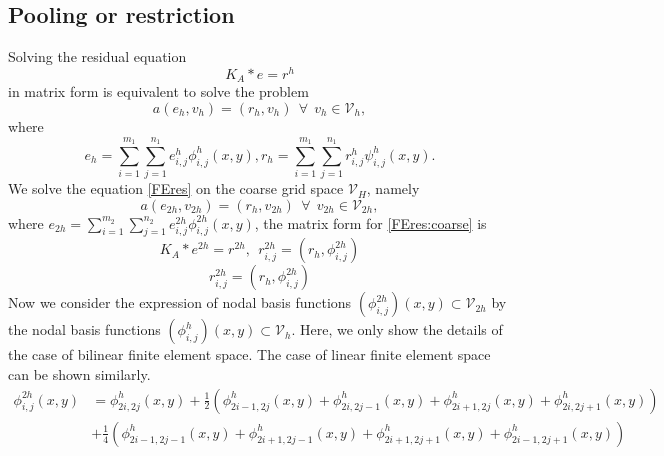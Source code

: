 \subsection{Pooling or restriction}\label{sec:cnn-restriction}
Solving the residual equation 
$$
K_A\ast e=r^h
$$
in matrix form is equivalent to solve the problem 
\begin{equation}\label{FEres}
a(e_h, v_h)=(r_h,v_h)~~\forall~~v_h\in \mathcal V_h,
\end{equation}
where 
\begin{equation}\label{expresion:residual}
e_h=\sum_{i=1}^{m_1}\sum_{j=1}^{n_1}e^h_{i,j}\phi^h_{i,j}(x,y), r_h=\sum_{i=1}^{m_1}\sum_{j=1}^{n_1}r^h_{i,j}\psi^h_{i,j}(x,y).
\end{equation}
We solve the equation \eqref{FEres} on the coarse grid space $\mathcal V_H$, namely 
\begin{equation}\label{FEres:coarse}
a(e_{2h}, v_{2h})=(r_h,v_{2h})~~\forall~~v_{2h}\in \mathcal V_{2h},
\end{equation}
where $e_{2h}=\sum_{i=1}^{m_2}\sum_{j=1}^{n_2}e^{2h}_{i,j}\phi^{2h}_{i,j}(x,y)$, the matrix form for \eqref{FEres:coarse} is 
\begin{equation}\label{coarse:matrix}
K_A\ast e^{2h}=r^{2h},~~r_{i,j}^{2h}=(r_h,\phi^{2h}_{i,j})
\end{equation}
\begin{equation}\label{restriction}
r_{i,j}^{2h}=(r_h,\phi^{2h}_{i,j})
\end{equation}
Now we consider the expression of nodal basis functions $(\phi_{i,j}^{2h})(x,y)\subset \mathcal V_{2h}$ 
by the nodal basis functions $(\phi_{i,j}^{h})(x,y)\subset \mathcal V_{h}$. Here, we only show the details of the case of 
bilinear finite element space. The case of linear finite element space can be shown similarly. 
\begin{equation}\label{basis:plongation}
\begin{split}
\phi_{i,j}^{2h}(x,y)&=\phi_{2i,2j}^{h}(x,y)+\frac{1}{2}\left(\phi_{2i-1,2j}^{h}(x,y)+\phi_{2i,2j-1}^{h}(x,y)
+\phi_{2i+1,2j}^{h}(x,y)+\phi_{2i,2j+1}^{h}(x,y)\right)\\
&+\frac{1}{4}\left(\phi_{2i-1,2j-1}^{h}(x,y)+\phi_{2i+1,2j-1}^{h}(x,y)
+\phi_{2i+1,2j+1}^{h}(x,y)+\phi_{2i-1,2j+1}^{h}(x,y)\right)
\end{split}
\end{equation}






